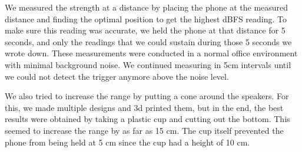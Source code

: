 \documentclass{report}
\theoremstyle{definition}
\theoremstyle{remark}
\begin{document}
We measured the strength at a distance by placing the phone at the measured distance and finding the optimal position to get the highest dBFS reading. To make sure this reading was accurate, we held the phone at that distance for 5 seconds, and only the readings that we could sustain during those 5 seconds we wrote down. These measurements were conducted in a normal office environment with minimal background noise. We continued measuring in 5cm intervals until we could not detect the trigger anymore above the noise level. 

We also tried to increase the range by putting a cone around the speakers. For this, we made multiple designs and 3d printed them, but in the end, the best results were obtained by taking a plastic cup and cutting out the bottom. This seemed to increase the range by as far as 15 cm. The cup itself prevented the phone from being held at 5 cm since the cup had a height of 10 cm.
\end{document}
